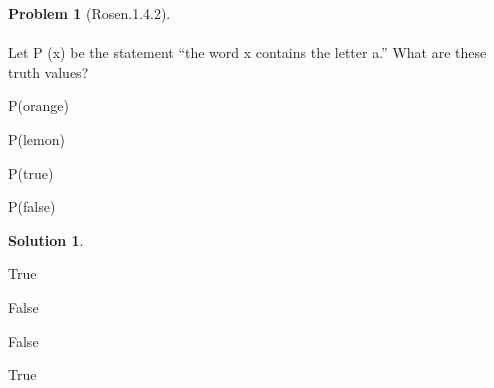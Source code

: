 \documentclass{article}
\theoremstyle{definition}
\newtheorem*{problem}{Problem}
\newtheorem*{solution}{Solution}
\begin{document}
\begin{problem}[Rosen.1.4.2]\ \\
\ \\
Let P (x) be the statement “the word x contains the letter a.” What are these truth values?\ \\
\begin{compactenum}
\renewcommand{\theenumi}{\alph{enumi}}
\item P(orange) 
\item P(lemon)
\item P(true) 
\item P(false)
\end{compactenum}
\end{problem}

\begin{solution}\ \\

\begin{compactenum}
\renewcommand{\theenumi}{\alph{enumi}}  
\item True
\item False
\item False
\item True





\end{compactenum}
\end{solution}
\end{document}
